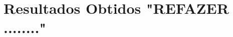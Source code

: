 \documentclass[a4paper]{abnt}
\begin{document}
%	

%	

%	


\chapter{Resultados Obtidos "REFAZER ........"}
\label{cha:resultados_parciais}
	

%	


%	

%
%	

%

%
\end{document}
